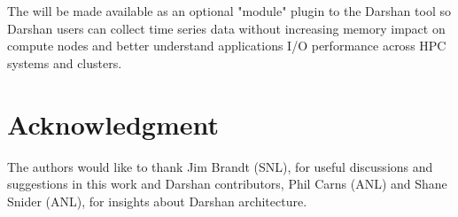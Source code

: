The \Darshan{} will be made available as an optional "module" plugin to the Darshan tool so 
Darshan users can collect time series data without increasing memory impact on compute nodes 
and better understand applications I/O performance across HPC systems and clusters. 

\section{Acknowledgment}
The authors would like to thank Jim Brandt (SNL), for useful discussions and suggestions in this work and Darshan contributors, Phil Carns (ANL) and Shane Snider (ANL), for insights about Darshan architecture.


